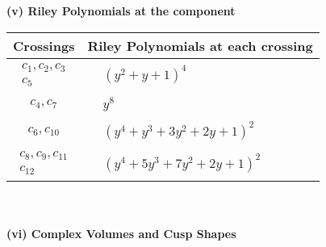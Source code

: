 \documentclass[1p]{elsarticle_modified}
\theoremstyle{definition}
\begin{document}
\newpage\renewcommand{\arraystretch}{1}
\flushleft \textbf{(v) Riley Polynomials at the component}\newline \\
\begin{tabular}{m{50pt}|m{274pt}}
Crossings & \hspace{64pt}Riley Polynomials at each crossing \\
\hline $$\begin{aligned}c_{1},c_{2},c_{3}\\c_{5}\end{aligned}$$&$\begin{aligned}
&(y^2+y+1)^4
\end{aligned}$\\
\hline $$\begin{aligned}c_{4},c_{7}\end{aligned}$$&$\begin{aligned}
&y^8
\end{aligned}$\\
\hline $$\begin{aligned}c_{6},c_{10}\end{aligned}$$&$\begin{aligned}
&(y^4+y^3+3 y^2+2 y+1)^2
\end{aligned}$\\
\hline $$\begin{aligned}c_{8},c_{9},c_{11}\\c_{12}\end{aligned}$$&$\begin{aligned}
&(y^4+5 y^3+7 y^2+2 y+1)^2
\end{aligned}$\\
\hline
\end{tabular}\\~\\
\newpage\flushleft \textbf{(vi) Complex Volumes and Cusp Shapes}
\end{document}
